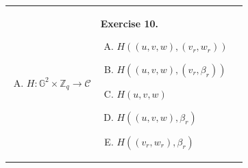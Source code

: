 \documentclass[../lecture-notes.tex]{subfiles}
\begin{document}
\begin{tcolorbox}[colback=gray!10!white,fonttitle=\bfseries,colframe=purple!80!black,title=Exercises 6-10. Non-Interactive Chaum-Pedersen Protocol.]
\begin{center}
\begin{tabular}{p{5cm}p{5.15cm}p{6cm}}
\begin{enumerate}[A)]
                \item $H: \mathbb{G}^2 \times \mathbb{Z}_q \to \mathcal{C}$
            \end{enumerate} 
            &
            \textbf{Exercise 10.}
            \begin{enumerate}[A)]
                \item $H((u,v,w),(v_r,w_r))$
                \item $H((u,v,w),(v_r,\beta_r))$
                \item $H(u,v,w)$
                \item $H((u,v,w),\beta_r)$
                \item $H((v_r,w_r),\beta_r)$
            \end{enumerate} 
        \end{tabular}
    \end{center}
\end{tcolorbox}
\end{document}
